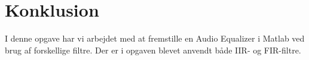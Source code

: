 \chapter{Konklusion}\label{ch:konclusion}
I denne opgave har vi arbejdet med at fremstille en Audio Equalizer i Matlab ved brug af forskellige filtre. Der er i opgaven blevet anvendt både IIR- og FIR-filtre.